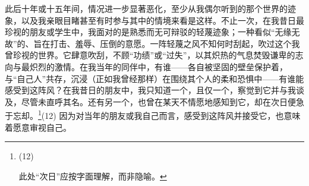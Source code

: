 此后十年或十五年间，情况进一步显著恶化，至少从我偶尔听到的那个世界的迹象，以及我亲眼目睹甚至有时参与其中的情境来看是这样。不止一次，在我昔日最珍视的朋友或学生中，我面对的是熟悉而无可辩驳的轻蔑迹象；一种看似“无缘无故”的、旨在打击、羞辱、压倒的意愿。一阵轻蔑之风不知何时刮起，吹过这个我曾珍视的世界。它肆意吹刮，不顾“功绩”或“过失”，以其炽热的气息焚毁谦卑的志向与最炽烈的激情。在我当年的同伴中，有谁——各自被坚固的壁垒保护着，与“自己人”共存，沉浸（正如我曾经那样）在围绕其个人的柔和恐惧中——有谁能感受到这阵风？在我昔日的朋友中，我只知道一个，且仅一个，察觉到它并与我谈及，尽管未直呼其名。还有另一个，也曾在某天不情愿地感知到它，却在次日便急于忘却。\footnote{(12)\par 此处“次日”应按字面理解，而非隐喻。}(12) 因为对当年的朋友或我自己而言，感受到这阵风并接受它，也意味着愿意审视自己。